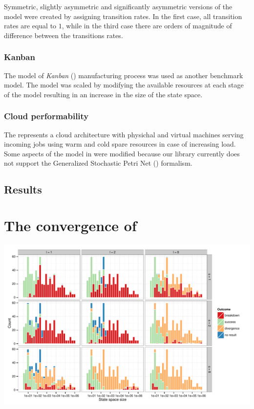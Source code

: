 Symmetric, slightly asymmetric and significantly asymmetric versions
of the model were created by assigning transition rates. In the first
case, all transition rates are equal to $1$, while in the third case
there are orders of magnitude of difference between the transitions
rates.

\subsubsection{Kanban}

The  model of \emph{Kanban} () manufacturing
process \citep{ciardo2003logical} was used as another benchmark
model. The model was scaled by modifying the available resources at
each stage of the model resulting in an increase in the size of the
state space.

\subsubsection{Cloud performability}

The represents a cloud architecture \citep{ghosh2012scalable} with
physichal and virtual machines serving incoming jobs using warm and
cold spare resources in case of increasing load. Some aspects of the
model in \citep{ghosh2012scalable} were modified because our library
currently does not support the Generalized Stochastic Petri Net
() formalism.

\subsection{Results}
\label{ssec:evaulations:results}

\section{The convergence of }
\label{sec:evaulations:idrstab}

\begin{figurepage}
  \includegraphics{figures/idrstab_histograms}
\end{figurepage}


